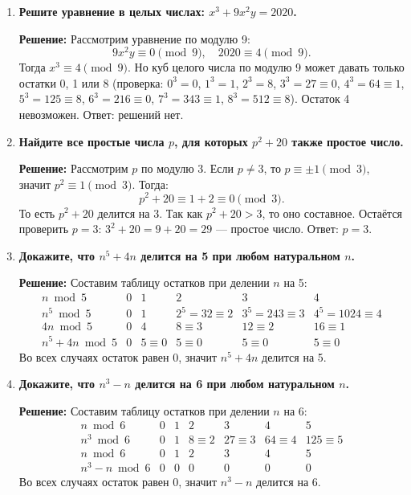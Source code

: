 \documentclass[12pt, a4paper]{article}
\begin{document}
\begin{enumerate}[label=\arabic*., wide=0pt, leftmargin=*]
\item \textbf{Решите уравнение в целых числах: \(x^3 + 9x^2y = 2020\).}

\textbf{Решение:}
Рассмотрим уравнение по модулю 9:
\[
9x^2y \equiv 0 \pmod{9},\quad 2020 \equiv 4 \pmod{9}.
\]
Тогда \(x^3 \equiv 4 \pmod{9}\). Но куб целого числа по модулю 9 может давать только остатки 0, 1 или 8 (проверка: \(0^3=0\), \(1^3=1\), \(2^3=8\), \(3^3=27\equiv0\), \(4^3=64\equiv1\), \(5^3=125\equiv8\), \(6^3=216\equiv0\), \(7^3=343\equiv1\), \(8^3=512\equiv8\)). Остаток 4 невозможен.
Ответ: решений нет.

\item \textbf{Найдите все простые числа \(p\), для которых \(p^2 + 20\) также простое число.}

\textbf{Решение:}
Рассмотрим \(p\) по модулю 3. Если \(p \neq 3\), то \(p \equiv \pm 1 \pmod{3}\), значит \(p^2 \equiv 1 \pmod{3}\). Тогда:
\[
p^2 + 20 \equiv 1 + 2 \equiv 0 \pmod{3}.
\]
То есть \(p^2 + 20\) делится на 3. Так как \(p^2 + 20 > 3\), то оно составное.
Остаётся проверить \(p = 3\): \(3^2 + 20 = 9 + 20 = 29\) — простое число.
Ответ: \(p = 3\).

\item \textbf{Докажите, что \(n^5 + 4n\) делится на 5 при любом натуральном \(n\).}

\textbf{Решение:}
Составим таблицу остатков при делении \(n\) на 5:
\[
\begin{array}{c|ccccc}
n \bmod 5 & 0 & 1 & 2 & 3 & 4 \\
\hline
n^5 \bmod 5 & 0 & 1 & 2^5=32\equiv2 & 3^5=243\equiv3 & 4^5=1024\equiv4 \\
4n \bmod 5 & 0 & 4 & 8\equiv3 & 12\equiv2 & 16\equiv1 \\
n^5 + 4n \bmod 5 & 0 & 5\equiv0 & 5\equiv0 & 5\equiv0 & 5\equiv0
\end{array}
\]
Во всех случаях остаток равен 0, значит \(n^5 + 4n\) делится на 5.

\item \textbf{Докажите, что \(n^3 - n\) делится на 6 при любом натуральном \(n\).}

\textbf{Решение:}
Составим таблицу остатков при делении \(n\) на 6:
\[
\begin{array}{c|cccccc}
n \bmod 6 & 0 & 1 & 2 & 3 & 4 & 5 \\
\hline
n^3 \bmod 6 & 0 & 1 & 8\equiv2 & 27\equiv3 & 64\equiv4 & 125\equiv5 \\
n \bmod 6 & 0 & 1 & 2 & 3 & 4 & 5 \\
n^3 - n \bmod 6 & 0 & 0 & 0 & 0 & 0 & 0
\end{array}
\]
Во всех случаях остаток равен 0, значит \(n^3 - n\) делится на 6.


\end{enumerate}
\end{document}

